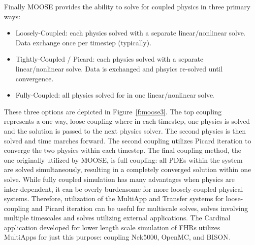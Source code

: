 Finally MOOSE provides the ability to solve for coupled physics in three primary ways:
\begin{itemize}
\item Loosely-Coupled: each physics solved with a separate linear/nonlinear solve. Data exchange once per
timestep (typically).
\item Tightly-Coupled / Picard: each physics solved with a separate linear/nonlinear solve. Data is exchanged
and phsyics re-solved until convergence.
\item Fully-Coupled: all physics solved for in one linear/nonlinear solve.
\end{itemize}
These three options are depicted in Figure~\ref{f:moose3}. The top coupling represents a one-way, loose coupling where in each timestep, one physics is solved and the solution is passed to the next physics solver. The second physics is then solved and time marches forward. The second coupling utilizes Picard iteration to converge the two physics within each timestep. The final coupling method, the one originally utilized by MOOSE, is full coupling: all PDEs within the system are solved simultaneously, resulting in a completely converged solution within one solve. While fully coupled simulation has many advantages when physics are inter-dependent, it can be
overly burdensome for more loosely-coupled physical systems. Therefore, utilization of the MultiApp and Transfer systems for loose-coupling and Picard iteration can be useful for multiscale solves, solves involving multiple timescales and solves utilizing external applications. The Cardinal application developed for lower length scale simulation of FHRs utilizes MultiApps for just this purpose: coupling Nek5000, OpenMC, and BISON.

